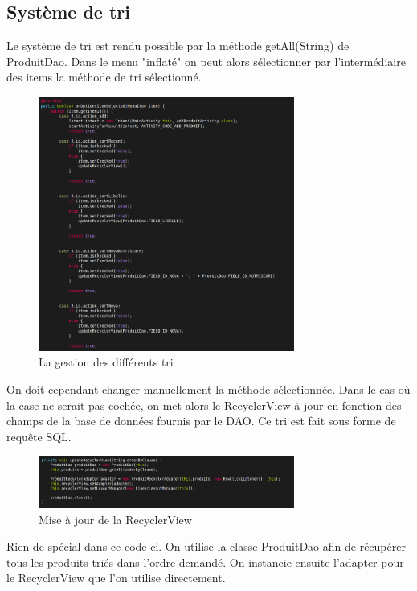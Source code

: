 \documentclass[report]{BetterDocument}
\newcommand{\bdd}{base de données}
\begin{document}
			\subsection{Système de tri}

				Le système de tri est rendu possible par la méthode getAll(String) de ProduitDao. Dans le menu "inflaté" on peut alors sélectionner par l'intermédiaire des items la méthode de tri sélectionné.

				\begin{figure}[H]
					\centering\includegraphics[width=0.75\textwidth, keepaspectratio]{img/activity/MainActivity/sort.png}
					\caption{La gestion des différents tri}
				\end{figure}

				On doit cependant changer manuellement la méthode sélectionnée. Dans le cas où la case ne serait pas cochée, on met alors le RecyclerView à jour en fonction des champs de la \bdd{} fournis par le DAO. Ce tri est fait sous forme de requête SQL.

				\begin{figure}[H]
					\centering\includegraphics[width=0.75\textwidth, keepaspectratio]{img/activity/MainActivity/update_recyclerview.png}
					\caption{Mise à jour de la RecyclerView}
				\end{figure}

				Rien de spécial dans ce code ci. On utilise la classe ProduitDao afin de récupérer tous les produits triés dans l'ordre demandé. On instancie ensuite l'adapter pour le RecyclerView que l'on utilise directement.
\end{document}
